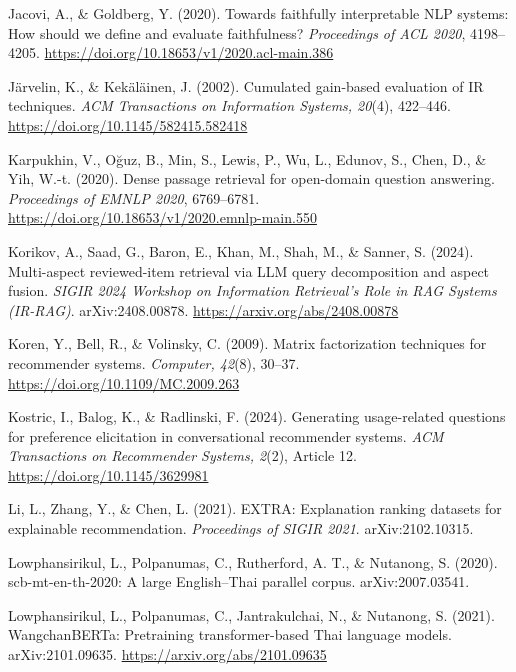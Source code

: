 Jacovi, A., \& Goldberg, Y. (2020). Towards faithfully interpretable NLP systems: How should
we define and evaluate faithfulness? \emph{Proceedings of ACL 2020}, 4198--4205.
\url{https://doi.org/10.18653/v1/2020.acl-main.386}

J{\"a}rvelin, K., \& Kek{\"a}l{\"a}inen, J. (2002). Cumulated gain-based evaluation of IR
techniques. \emph{ACM Transactions on Information Systems, 20}(4), 422--446.
\url{https://doi.org/10.1145/582415.582418}

Karpukhin, V., O\u{g}uz, B., Min, S., Lewis, P., Wu, L., Edunov, S., Chen, D., \& Yih, W.-t.
(2020). Dense passage retrieval for open-domain question answering.
\emph{Proceedings of EMNLP 2020}, 6769--6781.
\url{https://doi.org/10.18653/v1/2020.emnlp-main.550}

Korikov, A., Saad, G., Baron, E., Khan, M., Shah, M., \& Sanner, S. (2024). Multi-aspect
reviewed-item retrieval via LLM query decomposition and aspect fusion. \emph{SIGIR 2024
Workshop on Information Retrieval's Role in RAG Systems (IR-RAG)}. arXiv:2408.00878.
\url{https://arxiv.org/abs/2408.00878}

Koren, Y., Bell, R., \& Volinsky, C. (2009). Matrix factorization techniques for recommender
systems. \emph{Computer, 42}(8), 30--37.
\url{https://doi.org/10.1109/MC.2009.263}

Kostric, I., Balog, K., \& Radlinski, F. (2024). Generating usage-related questions for
preference elicitation in conversational recommender systems.
\emph{ACM Transactions on Recommender Systems, 2}(2), Article 12.
\url{https://doi.org/10.1145/3629981}

Li, L., Zhang, Y., \& Chen, L. (2021). EXTRA: Explanation ranking datasets for explainable
recommendation. \emph{Proceedings of SIGIR 2021}. arXiv:2102.10315.

Lowphansirikul, L., Polpanumas, C., Rutherford, A. T., \& Nutanong, S. (2020).
scb-mt-en-th-2020: A large English--Thai parallel corpus. arXiv:2007.03541.

Lowphansirikul, L., Polpanumas, C., Jantrakulchai, N., \& Nutanong, S. (2021).
WangchanBERTa: Pretraining transformer-based Thai language models. arXiv:2101.09635.
\url{https://arxiv.org/abs/2101.09635}

